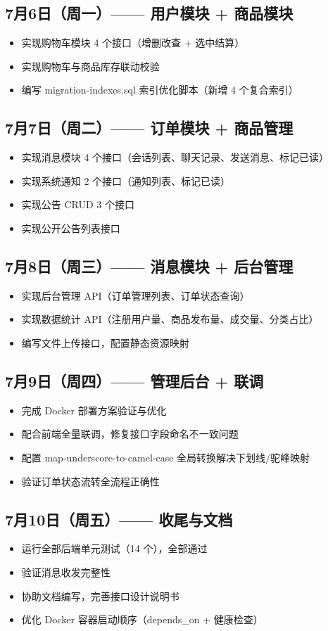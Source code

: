 \documentclass[12pt,a4paper]{ctexart}
\begin{document}
\subsection{7月6日（周一）—— 用户模块 + 商品模块}
\begin{itemize}
    \item 实现购物车模块 4 个接口（增删改查 + 选中结算）
    \item 实现购物车与商品库存联动校验
    \item 编写 migration-indexes.sql 索引优化脚本（新增 4 个复合索引）
\end{itemize}

\subsection{7月7日（周二）—— 订单模块 + 商品管理}
\begin{itemize}
    \item 实现消息模块 4 个接口（会话列表、聊天记录、发送消息、标记已读）
    \item 实现系统通知 2 个接口（通知列表、标记已读）
    \item 实现公告 CRUD 3 个接口
    \item 实现公开公告列表接口
\end{itemize}

\subsection{7月8日（周三）—— 消息模块 + 后台管理}
\begin{itemize}
    \item 实现后台管理 API（订单管理列表、订单状态查询）
    \item 实现数据统计 API（注册用户量、商品发布量、成交量、分类占比）
    \item 编写文件上传接口，配置静态资源映射
\end{itemize}

\subsection{7月9日（周四）—— 管理后台 + 联调}
\begin{itemize}
    \item 完成 Docker 部署方案验证与优化
    \item 配合前端全量联调，修复接口字段命名不一致问题
    \item 配置 map-underscore-to-camel-case 全局转换解决下划线/驼峰映射
    \item 验证订单状态流转全流程正确性
\end{itemize}

\subsection{7月10日（周五）—— 收尾与文档}
\begin{itemize}
    \item 运行全部后端单元测试（14 个），全部通过
    \item 验证消息收发完整性
    \item 协助文档编写，完善接口设计说明书
    \item 优化 Docker 容器启动顺序（depends\_on + 健康检查）
\end{itemize}
\end{document}
